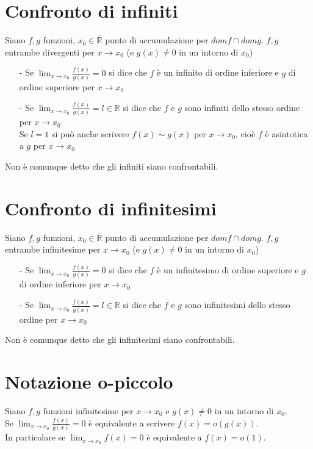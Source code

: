 \section{Confronto di infiniti}
Siano $f,g$ funzioni, $x_0 \in \overline{\mathbb{R}}$ punto di accumulazione per $domf \cap domg$. $f,g$ entrambe divergenti per $x \to x_0$ (e $g(x) \neq 0$ in un intorno di $x_0$)
\begin{enumerate}
\item[-]Se $\displaystyle \lim_{x \to x_0}\frac{f(x)}{g(x)} = 0$ si dice che $f$ è un infinito di ordine inferiore e $g$ di ordine superiore per $x \to x_0$
\item[-]Se $\displaystyle \lim_{x \to x_0}\frac{f(x)}{g(x)} = l \in \mathbb{R}$ si dice che $f$ e $g$ sono infiniti dello stesso ordine per $x \to x_0$\\
Se $l = 1$ si può anche scrivere $f(x) \sim g(x)$ per $x \to x_0$, cioè $f$ è asintotica a $g$ per $x \to x_0$ 
\end{enumerate}
Non è comunque detto che gli infiniti siano confrontabili.

\section{Confronto di infinitesimi}
Siano $f,g$ funzioni, $x_0 \in \overline{\mathbb{R}}$ punto di accumulazione per $domf \cap domg$. $f,g$ entrambe infinitesime per $x \to x_0$ (e $g(x) \neq 0$ in un intorno di $x_0$)
\begin{enumerate}
\item[-]Se $\displaystyle \lim_{x \to x_0}\frac{f(x)}{g(x)} = 0$ si dice che $f$ è un infinitesimo di ordine superiore e $g$ di ordine inferiore per $x \to x_0$
\item[-]Se $\displaystyle \lim_{x \to x_0}\frac{f(x)}{g(x)} = l \in \mathbb{R}$ si dice che $f$ e $g$ sono infinitesimi dello stesso ordine per $x \to x_0$\\
\end{enumerate}
Non è comunque detto che gli infinitesimi siano confrontabili.

\section{Notazione o-piccolo}
Siano $f,g$  funzioni infinitesime per $x \to x_0$ e $g(x) \neq 0$ in un intorno di $x_0$.\\
Se $\displaystyle \lim_{x \to x_0}\frac{f(x)}{g(x)} = 0$ è equivalente a scrivere $f(x) = o(g(x))$.\\
In particolare se $\displaystyle \lim_{x \to x_0}f(x) = 0$ è equivalente a $f(x) = o(1)$.

